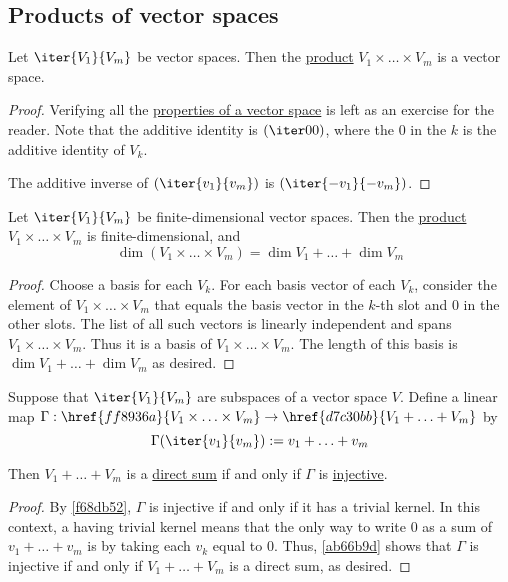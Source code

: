 \subsection{Products of vector spaces}\label{a9636c9}

\label{d7bbe29}

Let $\iter{V_1}{V_m}$ be vector spaces. Then the \href{ff8936a}{product}
$V_1\times\ldots\times V_m$ is a vector space.

\begin{proof}
  Verifying all the \href{fc83050}{properties of a vector space} is left as an
  exercise for the reader. Note that the additive identity is $(\iter00)$, where
  the $0$ in the $k$ is the additive identity of $V_k$.

  The additive inverse of $(\iter{v_1}{v_m})$ is $(\iter{-v_1}{-v_m})$.
\end{proof}

\label{b87c7ba}

Let $\iter{V_1}{V_m}$ be finite-dimensional vector spaces. Then the
\href{ff8936a}{product} $V_1\times\ldots\times V_m$ is finite-dimensional, and
$$
  \dim(V_1\times\ldots\times V_m)=\dim V_1+\ldots+\dim V_m
$$

\begin{proof}
  Choose a basis for each $V_k$. For each basis vector of each $V_k$, consider
  the element of $V_1\times\ldots\times V_m$ that equals the basis vector in the
  $k$-th slot and 0 in the other slots. The list of all such vectors is linearly
  independent and spans $V_1\times\ldots\times V_m$. Thus it is a basis of
  $V_1\times\ldots\times V_m$. The length of this basis is $\dim V_1+\ldots+\dim
  V_m$ as desired.
\end{proof}

\label{cc62620}

Suppose that $\iter{V_1}{V_m}$ are subspaces of a vector space $V$. Define a
linear map $\Gamma:\href{ff8936a}{V_1\times\ldots\times V_m}\to
\href{d7c30bb}{V_1+\ldots+V_m}$ by
$$
  \Gamma(\iter{v_1}{v_m}):=v_1+\ldots+v_m
$$

Then $V_1+\ldots+V_m$ is a \href{c67c961}{direct sum} if and only if $\Gamma$
is \href{ac44d1d}{injective}.

\begin{proof}
  By \autoref{f68db52}, $\Gamma$ is injective if and only if it has a trivial
  kernel. In this context, a having trivial kernel means that the only way to
  write 0 as a sum of $v_1+\ldots+v_m$ is by taking each $v_k$ equal to 0. Thus,
  \autoref{ab66b9d} shows that $\Gamma$ is injective if and only if
  $V_1+\ldots+V_m$ is a direct sum, as desired.
\end{proof}

